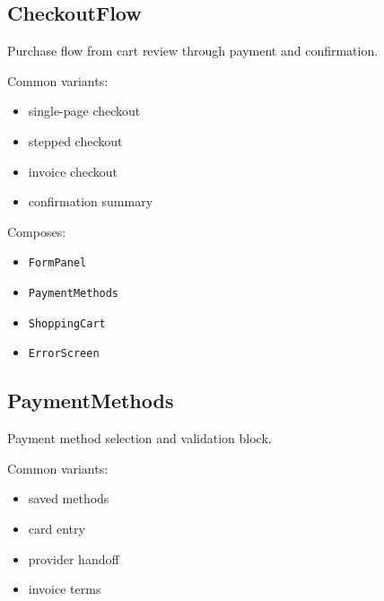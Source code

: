 \subsection{CheckoutFlow}\label{record-128-checkoutflow}

Purchase flow from cart review through payment and confirmation.

Common variants:

\begin{itemize}
\tightlist
\item
  single-page checkout
\item
  stepped checkout
\item
  invoice checkout
\item
  confirmation summary
\end{itemize}

Composes:

\begin{itemize}
\tightlist
\item
  \texttt{F\allowbreak{}o\allowbreak{}r\allowbreak{}m\allowbreak{}P\allowbreak{}a\allowbreak{}n\allowbreak{}e\allowbreak{}l}
\item
  \texttt{P\allowbreak{}a\allowbreak{}y\allowbreak{}m\allowbreak{}e\allowbreak{}n\allowbreak{}t\allowbreak{}M\allowbreak{}e\allowbreak{}t\allowbreak{}h\allowbreak{}o\allowbreak{}d\allowbreak{}s}
\item
  \texttt{S\allowbreak{}h\allowbreak{}o\allowbreak{}p\allowbreak{}p\allowbreak{}i\allowbreak{}n\allowbreak{}g\allowbreak{}C\allowbreak{}a\allowbreak{}r\allowbreak{}t}
\item
  \texttt{E\allowbreak{}r\allowbreak{}r\allowbreak{}o\allowbreak{}r\allowbreak{}S\allowbreak{}c\allowbreak{}r\allowbreak{}e\allowbreak{}e\allowbreak{}n}
\end{itemize}

\subsection{PaymentMethods}\label{record-128-paymentmethods}

Payment method selection and validation block.

Common variants:

\begin{itemize}
\tightlist
\item
  saved methods
\item
  card entry
\item
  provider handoff
\item
  invoice terms
\end{itemize}

